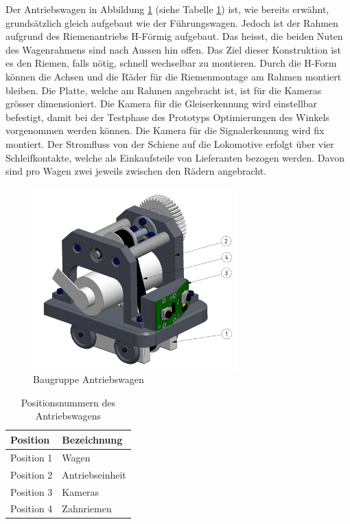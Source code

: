 \documentclass[../../main.tex]{subfiles}
\begin{document}
    Der Antriebswagen in Abbildung \ref{fig:antriebswagen} (siehe Tabelle \ref{tab:expl_antriebswagen}) ist, wie bereits
    erwähnt, grundsätzlich gleich aufgebaut wie der Führungswagen. Jedoch ist der Rahmen aufgrund des Riemenantriebs
    H-Förmig aufgebaut. Das heisst, die beiden Nuten des Wagenrahmens sind nach Aussen hin offen. Das Ziel dieser
    Konstruktion ist es den Riemen, falls nötig, schnell wechselbar zu montieren. Durch die H-Form können die Achsen und
    die Räder für die Riemenmontage am Rahmen montiert bleiben. Die Platte, welche am Rahmen angebracht ist,
    ist für die Kameras grösser dimensioniert. Die Kamera für die Gleiserkennung wird
    einstellbar befestigt, damit bei der Testphase des Prototyps Optimierungen des Winkels vorgenommen werden können.
    Die Kamera für die Signalerkennung wird fix montiert.
    Der Stromfluss von der Schiene auf die Lokomotive erfolgt über vier Schleifkontakte, welche als Einkaufsteile von
    Lieferanten bezogen werden. Davon sind pro Wagen zwei jeweils zwischen den Rädern angebracht.\\

    \begin{figure}[H] %
        \centering
        \includegraphics[width=0.7\textwidth]{antriebswagen.png}
        \caption{Baugruppe Antriebswagen}
        \label{fig:antriebswagen}
    \end{figure}

    \begin{table}[H] \centering
        \begin{tabular}{|l|l|}
        \hline
        \textbf{Position} & \textbf{Bezeichnung}\\
        \hline
        Position 1          & Wagen\\
         \hline
        Position 2          & Antriebseinheit\\
        \hline
        Position 3          & Kameras\\
        \hline
        Position 4          & Zahnriemen\\
        \hline
    \end{tabular}

    \caption{Positionsnummern des Antriebswagens}
    \label{tab:expl_antriebswagen}
    \end{table}
\end{document}
